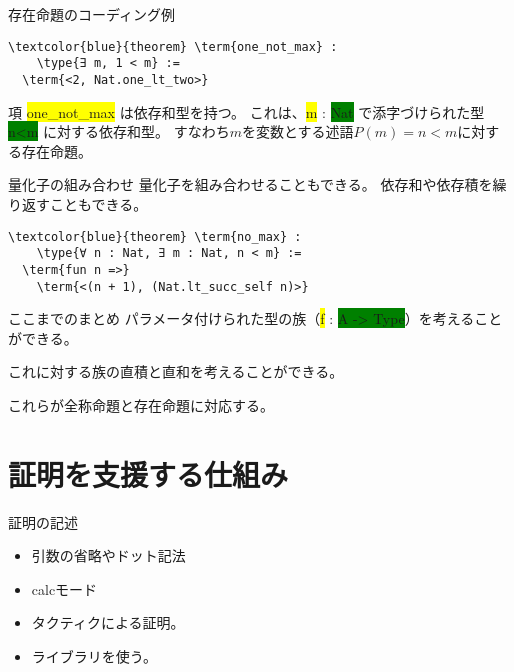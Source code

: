 \documentclass[unicode,12pt]{beamer}%
\newcommand{\type}[1]{\colorbox{green}{#1}}
\newcommand{\term}[1]{\colorbox{yellow}{#1}}
\begin{document}
\begin{frame}[fragile]{存在命題のコーディング例}
  \begin{tcolorbox}[title=Quantifier.lean]
  \setlength{\baselineskip}{12pt}
  \begin{Verbatim}[commandchars=\\\{\}, baselinestretch=1.5]
\textcolor{blue}{theorem} \term{one_not_max} :
    \type{∃ m, 1 < m} :=
  \term{<2, Nat.one_lt_two>}
  \end{Verbatim}
  \end{tcolorbox}  

  項 \term{one\_not\_max} は依存和型を持つ。
  これは、\term{m} : \type{Nat} で添字づけられた型 \type{n<m} に対する依存和型。
  すなわち$m$を変数とする述語$P(m)=n<m$に対する存在命題。
\end{frame}

\begin{frame}[fragile]{量化子の組み合わせ}
  量化子を組み合わせることもできる。
  依存和や依存積を繰り返すこともできる。

  \begin{tcolorbox}[title=Quantifier.lean]
    \setlength{\baselineskip}{12pt}
    \begin{Verbatim}[commandchars=\\\{\}, baselinestretch=1.5]
\textcolor{blue}{theorem} \term{no_max} :
    \type{∀ n : Nat, ∃ m : Nat, n < m} :=
  \term{fun n =>}
    \term{<(n + 1), (Nat.lt_succ_self n)>}
    \end{Verbatim}
    \end{tcolorbox}  
\end{frame}

\begin{frame}{ここまでのまとめ}
  パラメータ付けられた型の族（\term{f} : \type{A -> Type}）を考えることができる。

  これに対する族の直積と直和を考えることができる。

  これらが全称命題と存在命題に対応する。
\end{frame}

\section{証明を支援する仕組み}

\begin{frame}{証明の記述}
  \begin{itemize}
    \item 引数の省略やドット記法
    \item calcモード
    \item タクティクによる証明。
    \item ライブラリを使う。
  \end{itemize}
\end{frame}
\end{document}

